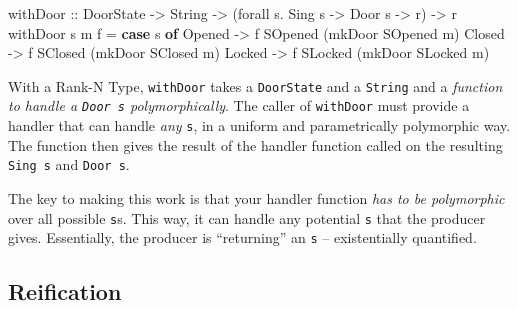 \documentclass[]{article}
\newenvironment{Shaded}{}{}
\newcommand{\DataTypeTok}[1]{\textcolor[rgb]{0.56,0.13,0.00}{#1}}
\newcommand{\FunctionTok}[1]{\textcolor[rgb]{0.02,0.16,0.49}{#1}}
\newcommand{\KeywordTok}[1]{\textcolor[rgb]{0.00,0.44,0.13}{\textbf{#1}}}
\newcommand{\NormalTok}[1]{#1}
\newcommand{\OtherTok}[1]{\textcolor[rgb]{0.00,0.44,0.13}{#1}}
\newcommand{\StringTok}[1]{\textcolor[rgb]{0.25,0.44,0.63}{#1}}
\begin{document}
\begin{Shaded}
\begin{Highlighting}[]
\NormalTok{withDoor}
\OtherTok{    ::} \DataTypeTok{DoorState}
    \OtherTok{->} \DataTypeTok{String}
    \OtherTok{->}\NormalTok{ (forall s}\FunctionTok{.} \DataTypeTok{Sing}\NormalTok{ s }\OtherTok{->} \DataTypeTok{Door}\NormalTok{ s }\OtherTok{->}\NormalTok{ r)}
    \OtherTok{->}\NormalTok{ r}
\NormalTok{withDoor s m f }\FunctionTok{=} \KeywordTok{case}\NormalTok{ s }\KeywordTok{of}
    \DataTypeTok{Opened} \OtherTok{->}\NormalTok{ f }\DataTypeTok{SOpened}\NormalTok{ (mkDoor }\DataTypeTok{SOpened}\NormalTok{ m)}
    \DataTypeTok{Closed} \OtherTok{->}\NormalTok{ f }\DataTypeTok{SClosed}\NormalTok{ (mkDoor }\DataTypeTok{SClosed}\NormalTok{ m)}
    \DataTypeTok{Locked} \OtherTok{->}\NormalTok{ f }\DataTypeTok{SLocked}\NormalTok{ (mkDoor }\DataTypeTok{SLocked}\NormalTok{ m)}
\end{Highlighting}
\end{Shaded}

With a Rank-N Type, \texttt{withDoor} takes a \texttt{DoorState} and a
\texttt{String} and a \emph{function to handle a \texttt{Door\ s}
polymorphically}. The caller of \texttt{withDoor} must provide a handler that
can handle \emph{any} \texttt{s}, in a uniform and parametrically polymorphic
way. The function then gives the result of the handler function called on the
resulting \texttt{Sing\ s} and \texttt{Door\ s}.

\begin{Shaded}
\end{Shaded}

The key to making this work is that your handler function \emph{has to be
polymorphic} over all possible \texttt{s}s. This way, it can handle any
potential \texttt{s} that the producer gives. Essentially, the producer is
``returning'' an \texttt{s} -- existentially quantified.

\hypertarget{reification}{%
\subsection{Reification}\label{reification}}
\end{document}
